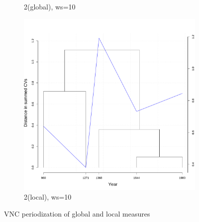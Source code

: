 \begin{figure}[H]
\begin{subfigure}{0.3\textwidth}
    \caption*{2\nds  (global), ws=10}
  \end{subfigure}
  \quad
  \begin{subfigure}{0.3\textwidth}
    \includegraphics[width=\linewidth]{figures_new/measures/VNC_measure_dist_w10_second_embed_local.pdf}
    \caption*{2\nds  (local), ws=10}
  \end{subfigure}
  
  \caption{VNC periodization of global and local measures}
\end{figure}

